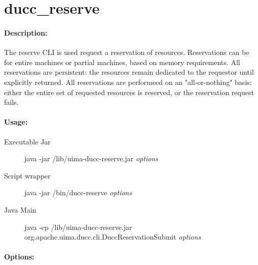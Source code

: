     \section{ducc\_reserve}

    \paragraph{Description:}
    The reserve CLI is used request a reservation of resources. Reservations can be for entire 
    machines or partial machines, based on memory requirements. All reservations are persistent: 
    the resources remain dedicated to the requestor until explicitly returned. All reservations are 
    performeed on an "all-or-nothing" basis: either the entire set of requested resources is reserved, 
    or the reservation request fails. 

    \paragraph{Usage:}
        \begin{description}
        \item[Executable Jar] java -jar \ducchome/lib/uima-ducc-reserve.jar {\em options}
        \item[Script wrapper] java -jar \ducchome/bin/ducc-reserve {\em options}
        \item[Java Main]      java -cp \ducchome/lib/uima-ducc-reserve.jar org.apache.uima.ducc.cli.DuccReservationSubmit {\em options}
        \end{description}

    \paragraph{Options:}
    
